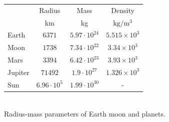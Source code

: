 


\vspace{0.5cm}

\begin{center}
  \begin{tabular}{|l|c|c|c|} \hline
               & Radius & Mass & Density \\ 
               & km   & kg & $\mathrm{kg/m^3}$\\ \hline
     Earth   & $6371$ & $5.97 \cdot 10^{24}$ & $5.515 \times 10^3$ \\
     Moon    & $1738$ & $7.34 \cdot 10^{22}$ & $3.34  \times 10^3$ \\ 
     Mars    & $3394$ & $6.42 \cdot 10^{23}$ & $3.93  \times 10^3$ \\
     Jupiter &$71492$ & $1.9  \cdot 10^{27}$ & $1.326 \times 10^3$ \\
     Sun     &$6.96\cdot 10^5$ 
                      & $1.99 \cdot 10^{30}$ &        -            \\
  \hline
  \end{tabular} \\
{ \captionfont Radius-mass parameters of Earth moon and planets.}
\end{center}





